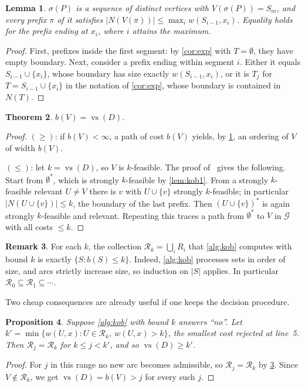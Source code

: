 \documentclass[11pt]{article}
\newtheorem{theorem}{Theorem}
\newtheorem{lemma}[theorem]{Lemma}
\newtheorem{proposition}[theorem]{Proposition}
\theoremstyle{definition}
\newtheorem{remark}[theorem]{Remark}
\newcommand{\vs}{\operatorname{vs}}
\newcommand{\Rel}{\mathcal{R}}
\newcommand{\Gr}{\mathcal{G}}
\newcommand{\cost}{w}
\newcommand{\bott}{b}
\newcommand{\set}[1]{\{#1\}}
\begin{document}
\begin{lemma}\label{lem:pathwidth}
$\sigma(P)$ is a sequence of distinct vertices with $V(\sigma(P))=S_m$, and
every prefix $\pi$ of it satisfies
$|N(V(\pi))|\le\max_i\cost(S_{i-1},x_i)$. Equality holds for the prefix
ending at $x_i$, where $i$ attains the maximum.
\end{lemma}
\begin{proof}
First, prefixes inside the first segment: by \cref{cor:exp} with
$T=\emptyset$, they have empty boundary. Next, consider a prefix ending
within segment $i$. Either it equals $S_{i-1}\cup\set{x_i}$, whose boundary
has size exactly $\cost(S_{i-1},x_i)$, or it is $T_j$ for
$T=S_{i-1}\cup\set{x_i}$ in the notation of \cref{cor:exp}, whose boundary
is contained in $N(T)$.
\end{proof}

\begin{theorem}\label{thm:bott}
$\bott(V)=\vs(D)$.
\end{theorem}
\begin{proof}
$(\ge)$: if $\bott(V)<\infty$, a path of cost $\bott(V)$ yields, by
\cref{lem:pathwidth}, an ordering of $V$ of width $\bott(V)$.

$(\le)$: let $k=\vs(D)$, so $V$ is $k$-feasible. The proof
of~\cite[Lemma~2]{Kob15} gives the following. Start from
$\emptyset^*$, which is strongly $k$-feasible by \cref{lem:kob1}. From a
strongly $k$-feasible relevant $U\ne V$ there is $v$ with $U\cup\set v$
strongly $k$-feasible; in particular $|N(U\cup\set v)|\le k$, the
boundary of the last prefix. Then $(U\cup\set v)^*$ is again strongly
$k$-feasible and relevant. Repeating this traces a path from $\emptyset^*$
to $V$ in $\Gr$ with all costs $\le k$.
\end{proof}

\begin{remark}\label{rem:Rk}
For each $k$, the collection $\Rel_k=\bigcup_i R_i$ that \cref{alg:kob}
computes with bound $k$ is exactly $\set{S:\bott(S)\le k}$. Indeed,
\cref{alg:kob} processes sets in order of size, and arcs strictly increase
size, so induction on $|S|$ applies. In particular
$\Rel_0\subseteq\Rel_1\subseteq\cdots$.
\end{remark}

Two cheap consequences are already useful if one keeps the decision
procedure.

\begin{proposition}\label{prop:next}
Suppose \cref{alg:kob} with bound $k$ answers ``no''. Let
$k'=\min\set{\cost(U,x): U\in\Rel_k,\ \cost(U,x)>k}$, the smallest cost
rejected at line~5. Then $\Rel_j=\Rel_k$ for $k\le j<k'$, and so
$\vs(D)\ge k'$.
\end{proposition}
\begin{proof}
For $j$ in this range no new arc becomes admissible, so $\Rel_j=\Rel_k$
by \cref{rem:Rk}. Since $V\notin\Rel_k$, we get $\vs(D)=\bott(V)>j$ for
every such $j$.
\end{proof}
\end{document}
